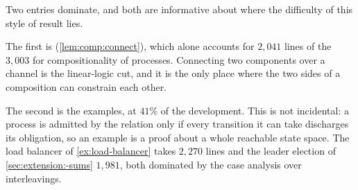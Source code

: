 Two entries dominate, and both are informative about where the
difficulty of this style of result lies.

The first is  (\cref{lem:comp:connect}), which
alone accounts for $2{,}041$ lines of the $3{,}003$ for compositionality of processes.
Connecting two components over a channel is the linear-logic cut, and
it is the only place where the two sides of a composition can
constrain each other.

The second is the examples, at $41\%$ of the development.
This is not incidental: a process is admitted by the relation only if
every transition it can take discharges its obligation, so an
example is a proof about a whole reachable state space.
The load balancer of \cref{ex:load-balancer} takes $2{,}270$ lines and
the leader election of \cref{sec:extension:-sums} $1{,}981$, both
dominated by the case analysis over interleavings.


